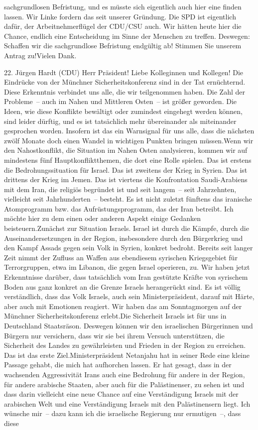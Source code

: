 \documentclass{article}
\begin{document}
sachgrundlosen Befristung, und es müsste sich eigentlich auch hier eine finden lassen. Wir Linke fordern das seit unserer Gründung. Die SPD ist eigentlich dafür, der Arbeitnehmerflügel der CDU/CSU auch. Wir hätten heute hier die Chance, endlich eine Entscheidung im Sinne der Menschen zu treffen. Deswegen: Schaffen wir die sachgrundlose Befristung endgültig ab! Stimmen Sie unserem Antrag zu!Vielen Dank.




	22. Jürgen Hardt (CDU) Herr Präsident! Liebe Kolleginnen und Kollegen! Die Eindrücke von der Münchner Sicherheitskonferenz sind in der Tat ernüchternd. Diese Erkenntnis verbindet uns alle, die wir teilgenommen haben. Die Zahl der Probleme – auch im Nahen und Mittleren Osten – ist größer geworden. Die Ideen, wie diese Konflikte bewältigt oder zumindest eingehegt werden können, sind leider dürftig, und es ist tatsächlich mehr übereinander als miteinander gesprochen worden. Insofern ist das ein Warnsignal für uns alle, dass die nächsten zwölf Monate doch einen Wandel in wichtigen Punkten bringen müssen.Wenn wir den Nahostkonflikt, die Situation im Nahen Osten analysieren, kommen wir auf mindestens fünf Hauptkonfliktthemen, die dort eine Rolle spielen. Das ist erstens die Bedrohungssituation für Israel. Das ist zweitens der Krieg in Syrien. Das ist drittens der Krieg im Jemen. Das ist viertens die Konfrontation Saudi-Arabiens mit dem Iran, die religiös begründet ist und seit langem – seit Jahrzehnten, vielleicht seit Jahrhunderten – besteht. Es ist nicht zuletzt fünftens das iranische Atomprogramm bzw. das Aufrüstungsprogramm, das der Iran betreibt. Ich möchte hier zu dem einen oder anderen Aspekt einige Gedanken beisteuern.Zunächst zur Situation Israels. Israel ist durch die Kämpfe, durch die Auseinandersetzungen in der Region, insbesondere durch den Bürgerkrieg und den Kampf ­Assads gegen sein Volk in Syrien, konkret bedroht. Bereits seit langer Zeit nimmt der Zufluss an Waffen aus ebendiesem syrischen Kriegsgebiet für Terrorgruppen, etwa im Libanon, die gegen Israel operieren, zu. Wir haben jetzt Erkenntnisse darüber, dass tatsächlich vom Iran gestützte Kräfte von syrischem Boden aus ganz konkret an die Grenze Israels herangerückt sind. Es ist völlig verständlich, dass das Volk Israels, auch sein Ministerpräsident, darauf mit Härte, aber auch mit Emotionen reagiert. Wir haben das am Sonntagmorgen auf der Münchner Sicherheitskonferenz erlebt.Die Sicherheit Israels ist für uns in Deutschland Staatsräson. Deswegen können wir den israelischen Bürgerinnen und Bürgern nur versichern, dass wir sie bei ihrem Versuch unterstützen, die Sicherheit des Landes zu gewährleisten und Frieden in der Region zu erreichen. Das ist das erste Ziel.Ministerpräsident Netanjahu hat in seiner Rede eine kleine Passage gehabt, die mich hat aufhorchen lassen. Er hat gesagt, dass in der wachsenden Aggressivität Irans auch eine Bedrohung für andere in der Region, für andere arabische Staaten, aber auch für die Palästinenser, zu sehen ist und dass darin vielleicht eine neue Chance auf eine Verständigung Israels mit der arabischen Welt und eine Verständigung Israels mit den Palästinensern liegt. Ich wünsche mir – dazu kann ich die israelische Regierung nur ermutigen –, dass diese 
\end{document}
